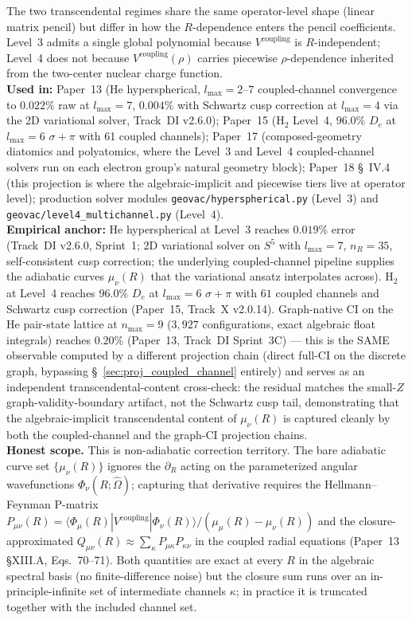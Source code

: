 The two transcendental regimes share the same operator-level shape
(linear matrix pencil) but differ in how the $R$-dependence enters
the pencil coefficients.  Level~3 admits a single global polynomial
because $V^\text{coupling}$ is $R$-independent; Level~4 does not
because $V^\text{coupling}(\rho)$ carries piecewise $\rho$-dependence
inherited from the two-center nuclear charge function.\\
\textbf{Used in:} Paper~13 (He hyperspherical, $l_\text{max}=2$--$7$
coupled-channel convergence to $0.022\%$ raw at $l_\text{max}=7$,
$0.004\%$ with Schwartz cusp correction at $l_\text{max}=4$ via the 2D
variational solver, Track~DI v2.6.0); Paper~15 (H$_2$ Level~4,
$96.0\%$ $D_e$ at $l_\text{max}=6$ $\sigma+\pi$ with 61 coupled
channels); Paper~17 (composed-geometry diatomics and polyatomics,
where the Level~3 and Level~4 coupled-channel solvers run on each
electron group's natural geometry block); Paper~18 \S~IV.4 (this
projection is where the algebraic-implicit and piecewise tiers live
at operator level); production solver modules
\texttt{geovac/hyperspherical.py} (Level~3) and
\texttt{geovac/level4\_multichannel.py} (Level~4).\\
\textbf{Empirical anchor:} He hyperspherical at Level~3 reaches
$0.019\%$ error (Track~DI v2.6.0, Sprint~1; 2D variational solver on
$S^5$ with $l_\text{max}=7$, $n_R=35$, self-consistent cusp
correction; the underlying coupled-channel pipeline supplies the
adiabatic curves $\mu_\nu(R)$ that the variational ansatz interpolates
across).  H$_2$ at Level~4 reaches $96.0\%$ $D_e$ at $l_\text{max}=6$
$\sigma+\pi$ with $61$ coupled channels and Schwartz cusp correction
(Paper~15, Track~X v2.0.14).  Graph-native CI on the He pair-state
lattice at $n_\text{max}=9$ ($3{,}927$ configurations, exact algebraic
float integrals) reaches $0.20\%$ (Paper~13, Track~DI Sprint~3C) ---
this is the SAME observable computed by a different projection chain
(direct full-CI on the discrete graph, bypassing
\S~\ref{sec:proj_coupled_channel} entirely) and serves as an
independent transcendental-content cross-check: the residual matches
the small-$Z$ graph-validity-boundary artifact, not the Schwartz
cusp tail, demonstrating that the algebraic-implicit transcendental
content of $\mu_\nu(R)$ is captured cleanly by both the coupled-channel
and the graph-CI projection chains.\\
\textbf{Honest scope.}  This is non-adiabatic correction territory.
The bare adiabatic curve set $\{\mu_\nu(R)\}$ ignores the
$\partial_R$ acting on the parameterized angular wavefunctions
$\Phi_\nu(R; \hat{\Omega})$; capturing that derivative requires the
Hellmann--Feynman P-matrix $P_{\mu\nu}(R) = \langle \Phi_\mu(R) |
V^\text{coupling} | \Phi_\nu(R) \rangle / (\mu_\mu(R) - \mu_\nu(R))$
and the closure-approximated $Q_{\mu\nu}(R) \approx \sum_\kappa
P_{\mu\kappa} P_{\kappa\nu}$ in the coupled radial equations (Paper~13
§XIII.A, Eqs.~70--71).  Both quantities are exact at every $R$ in the
algebraic spectral basis (no finite-difference noise) but the closure
sum runs over an in-principle-infinite set of intermediate channels
$\kappa$; in practice it is truncated together with the included
channel set.

